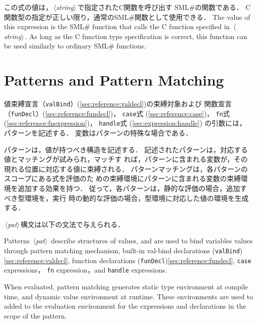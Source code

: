 \documentclass{jbook}
\newcommand{\txt}[2]{#2}
\newcommand{\smlsharp}{SML\#}
\newcommand{\code}[1]{\mbox{\large\tt #1}}
\newcommand{\nonterm}[1]{\mbox{$\,\langle$}{\it #1}\mbox{$\rangle\,$}}
\begin{document}
\ifjp%
	この式の値は，\nonterm{string}で指定されたC関数を呼び出す
\smlsharp{}の関数である．
	C関数型の指定が正しい限り，通常の\smlsharp{}関数として使用できる．
\else%
	The value of this expression is the \smlsharp{} function
that calls the C function specified in \nonterm{string}.
	As long as the C function type specification is correct,
this function can be used similarly to ordinary \smlsharp{} functions.
\fi%


\chapter{\txt{パターンとパターンマッチング}{Patterns and Pattern Matching}}
\label{chap:reference:patterns}

\ifjp%

	値束縛宣言（\code{valBind}）(\ref{sec:reference:valdecl})の束縛対象および
関数宣言（\code{funDecl}）(\ref{sec:reference:fundecl})，
\code{case}式 (\ref{sec:reference:case})，
\code{fn}式 (\ref{sec:reference:fnexpression})，
\code{handle}式 (\ref{sec:expression:handle})
の引数には，パターンを記述する．
	変数はパターンの特殊な場合である．

	パターンは，値が持つべき構造を記述する．
	記述されたパターンは，対応する値とマッチングが試みられ，マッチす
れば，パターンに含まれる変数が，その現れる位置に対応する値に束縛される．
	パターンマッチングは，各パターンのスコープにある式を評価のた
めの束縛環境にパターンに含まれる変数の束縛環境を追加する効果を持つ．
	従って，各パターンは，静的な評価の場合，追加すべき型環境を，実行
時の動的な評価の場合，型環境に対応した値の環境を生成する．

\nonterm{pat}構文は以下の文法で与えられる．
\else%

	Patterns \nonterm{pat} describe structures of values, and are
used to bind variables values through pattern matching mechanism, built-in
val-bind declarations (\code{valBind})\ref{sec:reference:valdecl}, 
function declarations (\code{funDecl})\ref{sec:reference:fundecl},
\code{case} expressions，
\code{fn} expression，and
\code{handle} expressions.

	When evaluated, pattern matching generates static type
environment at compile time, and dynamic value environment at runtime.
	These environments are used to added to the evaluation
environment for the expressions and declarations in the scope of the
pattern.
\end{document}
